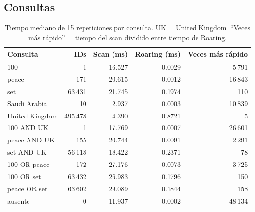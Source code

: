 \documentclass[11pt,a4paper]{article}
\begin{document}
\subsection{Consultas}
\begin{table}[htbp]
\centering\small
\begin{tabular}{lrrrr}
\toprule
Consulta & IDs & Scan (ms) & Roaring (ms) & Veces más rápido \\
\midrule
100 & 1 & 16.527 & 0.0029 & 5\,791 \\
peace & 171 & 20.615 & 0.0012 & 16\,843 \\
set & 63\,431 & 21.745 & 0.1974 & 110 \\
Saudi Arabia & 10 & 2.937 & 0.0003 & 10\,839 \\
United Kingdom & 495\,478 & 4.390 & 0.8721 & 5 \\
100 AND UK & 1 & 17.769 & 0.0007 & 26\,601 \\
peace AND UK & 155 & 20.744 & 0.0091 & 2\,291 \\
set AND UK & 56\,118 & 18.422 & 0.2371 & 78 \\
100 OR peace & 172 & 27.176 & 0.0073 & 3\,725 \\
100 OR set & 63\,432 & 26.983 & 0.1796 & 150 \\
peace OR set & 63\,602 & 29.089 & 0.1844 & 158 \\
ausente & 0 & 11.937 & 0.0002 & 48\,134 \\
\bottomrule
\end{tabular}
\caption{Tiempo mediano de 15 repeticiones por consulta. UK = United Kingdom. ``Veces más rápido'' = tiempo del scan dividido entre tiempo de Roaring.}\label{tab:latencias}
\end{table}
\end{document}
